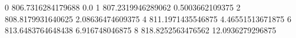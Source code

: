 0 806.7316284179688 0.0
1 807.2319946289062 0.5003662109375
2 808.8179931640625 2.08636474609375
4 811.1971435546875 4.46551513671875
6 813.6483764648438 6.916748046875
8 818.8252563476562 12.0936279296875
